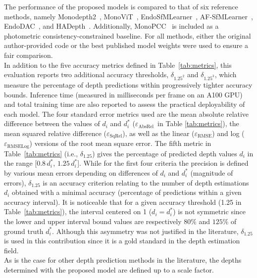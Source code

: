 \documentclass[a4paper,fleqn]{cas-dc}
\begin{document}
{ The performance of the proposed models is compared to that of six reference methods, namely Monodepth2~\citep{Godard_ICCV_2019}, MonoViT~\citep{Zhao_3DV_2022}, 
EndoSfMLearner~\citep{Ozyoruk_MIA_2021}, AF-SfMLearner~\citep{Shao_MIA_2022}, EndoDAC~\citep{EndoDAC_MICCAI_2024}, and HADepth~\citep{HAdepth_2025}. Additionally, MonoPCC~\citep{wang2025monopcc}  is included as a photometric consistency-constrained baseline. For all methods, either the original author-provided code or the best published model weights were used to ensure a fair comparison. \\
%
In addition to the five accuracy metrics defined in Table~\ref{tab:metrics}, this evaluation reports 
two additional accuracy thresholds, $\delta_{1.25^2}$ and $\delta_{1.25^3}$, which measure the percentage 
of depth predictions within progressively tighter accuracy bounds. Inference time (measured in milliseconds per frame on an A100 GPU) and total training time are also reported to assess the practical deployability of each model.
%
The four standard error metrics used are the mean absolute relative difference between the values of $d_i$ and $d_i^*$ ($\varepsilon_\textrm{AbsRel}$~in Table \ref{tab:metrics}), the mean squared relative difference ($\varepsilon_\textrm{SqRel}$), as well as the linear ($\varepsilon_\textrm{RMSE}$) and log ($\varepsilon_\textrm{RMSELog}$) versions  of the root mean square error. 
%
The fifth metric in Table~\ref{tab:metrics} (i.e., $\delta_{1.25}$)  gives the percentage of predicted depth values $d_i$  in the range  [$0.8\,d_i^*$, $1.25\,d_i^*$]. While for the first four criteria the precision is defined by various mean errors depending on differences of $d_i$ and $d_i^*$ (magnitude of errors), $\delta_{1.25}$ is an accuracy criterion relating to the number of depth estimations $d_i$ obtained with a minimal accuracy (percentage of predictions within a given accuracy interval). It is noticeable that for a given accuracy threshold (1.25 in Table~\ref{tab:metrics}), the interval centered on 1 ($d_i = d_i^*$) is not symmetric since the lower and upper interval bound values are respectively $80\%$ and $125\%$ of ground truth $d_i^*$. Although this asymmetry was not justified in the literature, $\delta_{1.25}$ is used in this contribution since it is a gold standard in the depth estimation field. \vspace*{1mm} \\ 
%
As is the case for other depth prediction methods in the literature, the depths determined with the proposed model are defined up to a scale factor. 
}
\end{document}
